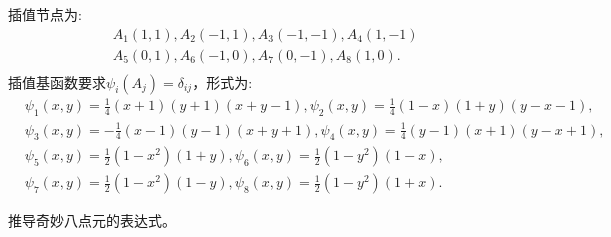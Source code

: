 插值节点为:
\begin{equation}
    \begin{aligned}
        &A_{1}(1,1),A_{2}(-1,1),A_{3}(-1,-1),A_{4}(1,-1)\\
        &A_{5}(0,1),A_{6}(-1,0),A_{7}(0,-1),A_{8}(1,0).\\
    \end{aligned}
\end{equation}
插值基函数要求$\psi_{i}(A_{j})=\delta_{ij}$，形式为:
\begin{equation}
    \begin{aligned}
        &\psi_{1}(x,y)=\frac{1}{4}(x+1)(y+1)(x+y-1),\psi_{2}(x,y)=\frac{1}{4}(1-x)(1+y)(y-x-1),\\
        &\psi_{3}(x,y)=-\frac{1}{4}(x-1)(y-1)(x+y+1),\psi_{4}(x,y)=\frac{1}{4}(y-1)(x+1)(y-x+1),\\
        &\psi_{5}(x,y)=\frac{1}{2}(1-x^2)(1+y),\psi_{6}(x,y)=\frac{1}{2}(1-y^2)(1-x),\\
        &\psi_{7}(x,y)=\frac{1}{2}(1-x^2)(1-y),\psi_{8}(x,y)=\frac{1}{2}(1-y^2)(1+x).
    \end{aligned}
\end{equation}
\begin{exercise}
    推导奇妙八点元的表达式。
\end{exercise}